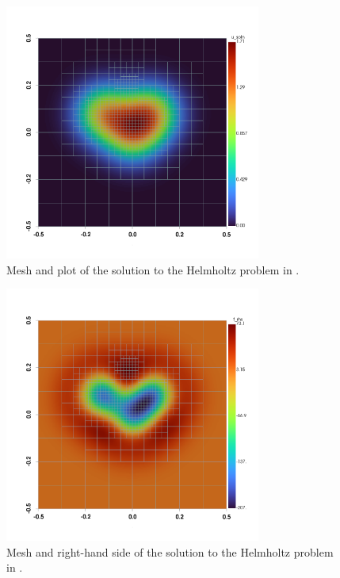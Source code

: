 \begin{figure}
    \centering
    \includegraphics[width=0.75\textwidth, trim={0 100 0 0}]{figures/plot_helmholtz_u.png}
    \caption{Mesh and plot of the solution to the Helmholtz problem in .}
    \label{fig:helmholtz_u_plot}
\end{figure}

\begin{figure}
    \centering
    \includegraphics[width=0.75\textwidth, trim={0 100 0 0}]{figures/plot_helmholtz_f.png}
    \caption{Mesh and right-hand side of the solution to the Helmholtz problem in .}
    \label{fig:helmholtz_f_plot}
\end{figure}

